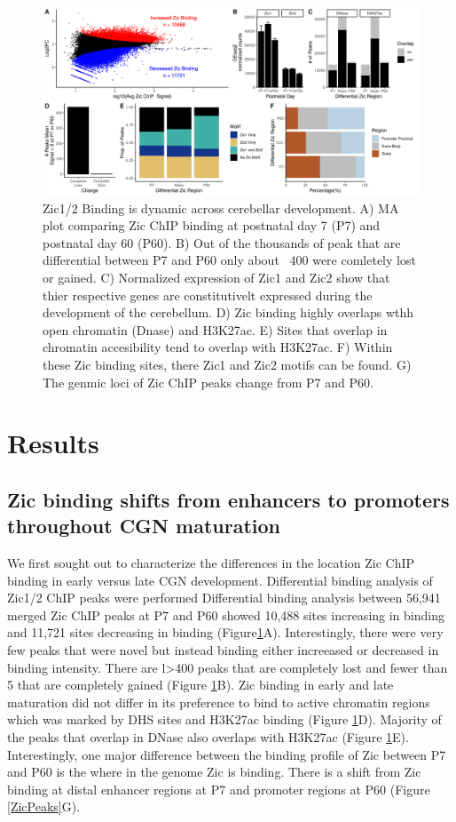 \documentclass[fleqn,10pt,twocolumn]{wlscirep}
\begin{document}
\begin{figure}[ht]
\centering
\includegraphics[width=.95\textwidth]{../figures/figure1.png}
\caption{ Zic1/2 Binding is dynamic across cerebellar development. A) MA plot comparing Zic ChIP binding at postnatal day 7 (P7) and postnatal day 60 (P60). B) Out of the thousands of peak that are differential between P7 and P60 only about ~400 were comletely lost or gained. C) Normalized expression of Zic1 and Zic2 show that thier respective genes are constitutivelt expressed during the development of the cerebellum. D) Zic binding highly overlaps wthh open chromatin (Dnase) and H3K27ac. E) Sites that overlap in chromatin accesibility tend to overlap with H3K27ac. F) Within these Zic binding sites, there Zic1 and Zic2 motifs can be found. G) The genmic loci of Zic ChIP peaks change from P7 and P60. }
\label{fig:ZicPeaks}
\end{figure}


\section*{Results}

\subsection*{Zic binding shifts from enhancers to promoters throughout CGN maturation} 
We first sought out to characterize the differences in the location Zic ChIP binding in early versus late CGN development. Differential binding analysis of Zic1/2 ChIP peaks were performed Differential binding analysis between 56,941 merged Zic ChIP peaks at P7 and P60 showed  10,488 sites increasing in binding and 11,721 sites decreasing in binding (Figure\ref{fig:ZicPeaks}A). Interestingly, there were very few peaks that were novel but instead binding either increeased or decreased in binding intensity. There are l>400 peaks that are completely lost and fewer than 5 that are completely gained (Figure \ref{fig:ZicPeaks}B). Zic binding in early and late maturation did not differ in its preference to bind to active chromatin regions which was marked by DHS sites and H3K27ac binding (Figure \ref{fig:ZicPeaks}D). Majority of the peaks that overlap in DNase also overlaps with H3K27ac (Figure \ref{fig:ZicPeaks}E). Interestingly, one major difference between the binding profile of Zic between P7 and P60 is the where in the genome Zic is binding. There is a shift from Zic binding at distal enhancer regions at P7 and promoter regions at P60 (Figure \ref{ZicPeaks}G). 
\end{document}
